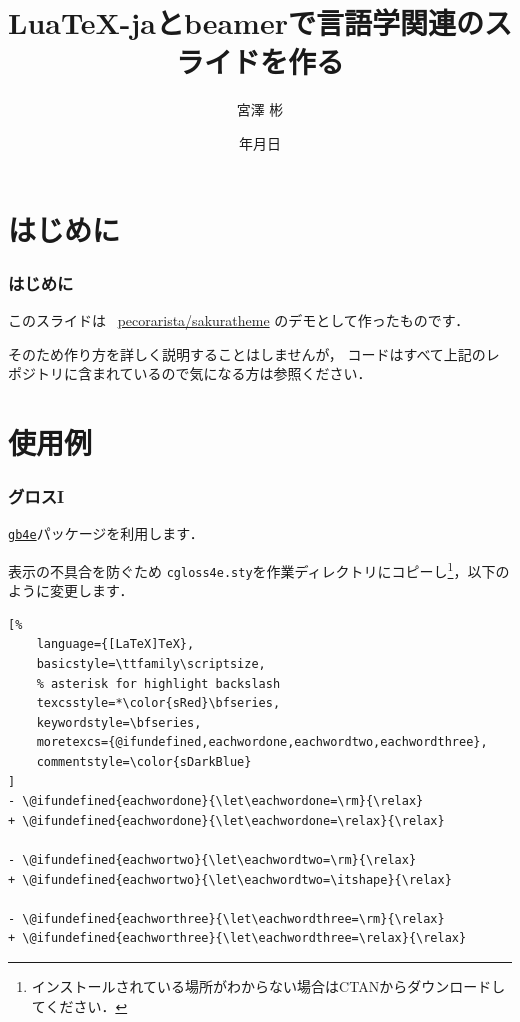 \documentclass[12pt,unicode]{beamer}
\title{Lua\TeX{}-jaとbeamerで言語学関連のスライドを作る}
\institute{総合研究大学院大学}
\author{宮澤 彬}
\date{{\number\year}年{\number\month}月{\number\day}日}
\begin{document}
\begin{frame}
    \nocite{demo}
    \maketitle
\end{frame}

\section{はじめに}
\begin{frame}
    \frametitle{はじめに}
    このスライドは \faGithub\ \href{https://github.com/pecorarista/sakuratheme}{\ttfamily pecorarista/sakuratheme}
    のデモとして作ったものです．

    \bigskip

    そのため作り方を詳しく説明することはしませんが，
    コードはすべて上記のレポジトリに含まれているので気になる方は参照ください．
\end{frame}

\section{使用例}
\begin{frame}[fragile]
\frametitle{グロスI}
\href{https://ctan.org/pkg/gb4e}{\texttt{gb4e}}パッケージを利用します．

\bigskip

表示の不具合を防ぐため
    \texttt{cgloss4e.sty}を作業ディレクトリにコピーし\footnote[frame]{%
インストールされている場所がわからない場合はCTANからダウンロードしてください．
}，以下のように変更します．
\begin{leftbar}
\begin{lstlisting}[%
    language={[LaTeX]TeX},
    basicstyle=\ttfamily\scriptsize,
    % asterisk for highlight backslash
    texcsstyle=*\color{sRed}\bfseries,
    keywordstyle=\bfseries,
    moretexcs={@ifundefined,eachwordone,eachwordtwo,eachwordthree},
    commentstyle=\color{sDarkBlue}
]
- \@ifundefined{eachwordone}{\let\eachwordone=\rm}{\relax}
+ \@ifundefined{eachwordone}{\let\eachwordone=\relax}{\relax}

- \@ifundefined{eachwortwo}{\let\eachwordtwo=\rm}{\relax}
+ \@ifundefined{eachwortwo}{\let\eachwordtwo=\itshape}{\relax}

- \@ifundefined{eachworthree}{\let\eachwordthree=\rm}{\relax}
+ \@ifundefined{eachworthree}{\let\eachwordthree=\relax}{\relax}
\end{lstlisting}
\end{leftbar}
\end{frame}
\end{document}
